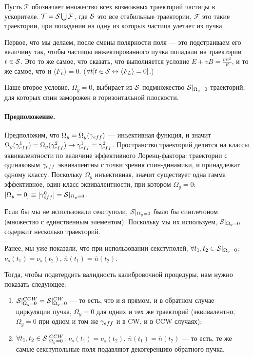 \documentclass[a4paper,14pt]{article}
\newcommand{\Traj}{\mathcal T}
\newcommand{\Fail}{\mathcal F}
\newcommand{\avg}[1]{\langle {#1} \rangle}
\newcommand{\W}{\Omega}
\newcommand{\nbar}{\bar n}
\begin{document}
Пусть $\Traj$ обозначает множество всех возможных траекторий частицы в ускорителе. $\Traj = \Stab \bigcup \Fail$,
где $\Stab$ это все стабильные траектории, $\Fail$ это такие траектории, при попадании на одну из которых
частица улетает из пучка.

Первое, что мы делаем, после смены полярности поля --- это подстраиваем его величину так, чтобы частицы
инжектированного пучка попадали на траектории $t\in \Stab$. Это то же самое, что сказать, что выполняется
условие $E + vB = \frac{mv^2}{R}$, и то же самое, что и $\avg{F_L} = 0$.
($\forall t [t\in\Stab \leftrightarrow \avg{F_L} = 0]$.)

Наше второе условие, $\W_y = 0$, выбирает из $\Stab$ подмножество $\Stab*$ траекторий,
для которых спин заморожен в горизонтальной плоскости.

\paragraph{Предположение.}
Предположим, что $\W_y = \W_y(\g*)$ --- инъективная функция,
и значит $\W_y(\g*^1) = \W_y(\g*^2) \rightarrow \g*^1 = \g*^2$. Пространство траекторий делится на
классы эквивалентности по величине эффективного Лоренц-фактора: траектории с одинаковым $\g*$ эквивалентны
с точки зрения спин-динамики, и принадлежат одному классу. Поскольку $\W_y$ инъективная, значит существует
одна гамма эффективное, один класс эквивалентности, при котором $\W_y=0$: $[\W_y=0]\equiv [\g*^0] = \Stab*$.

Если бы мы не использовали секступоли, $\Stab*$ было бы синглетоном (множество с единственным элементом).
Поскольку мы их используем, $\Stab*$ содержит несколько траекторий.

Ранее, мы уже показали, что при использовании секступолей, $\forall t_1,t_2\in\Stab*$:
$\nu_s(t_1) = \nu_s(t_2)$, $\nbar(t_1) = \nbar(t_2)$.

Тогда, чтобы подвтердить валидность калибровочной процедуры, нам нужно показать следующее:
\begin{enumerate}
\item $\Stab*^{CCW} = \Stab*^{CW}$ --- то есть, что и я прямом, и в обратном случае циркуляции пучка,
  $\W_y = 0$ для одних и тех же траекторий (эквивалентно, $\W_y=0$ при одном и том же $\g*$ и в CW, и в CCW
  случаях);
\item $\forall t_1,t_2\in\Stab*^{CCW}$: $\nu_s(t_1) = \nu_s(t_2)$, $\nbar(t_1) = \nbar(t_2)$ ---
  то есть, те же самые секступольные поля подавляют декогеренцию обратного пучка.
\end{enumerate}
\end{document}
